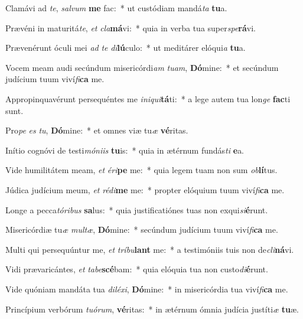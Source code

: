 \item Clamávi ad \textit{te}, \textit{sal}\textit{vum} \textbf{me} fac:~* ut custódiam mandá\textit{ta} \textbf{tu}a.
\item Prævéni in maturitá\textit{te}, \textit{et} \textit{cla}\textbf{má}vi:~* quia in verba tua super\textit{spe}\textbf{rá}vi.
\item Prævenérunt óculi mei \textit{ad} \textit{te} \textit{di}\textbf{lú}culo:~* ut meditárer elóqui\textit{a} \textbf{tu}a.
\item Vocem meam audi secúndum misericórdi\textit{am} \textit{tu}\textit{am}, \textbf{Dó}mine:~* et secúndum judícium tuum viví\textit{fi}\textbf{ca} me.
\item Appropinquavérunt persequéntes me \textit{in}\textit{i}\textit{qui}\textbf{tá}ti:~* a lege autem tua lon\textit{ge} \textbf{fac}ti sunt.
\item Pro\textit{pe} \textit{es} \textit{tu}, \textbf{Dó}mine:~* et omnes viæ tu\textit{æ} \textbf{vé}ritas.
\item Inítio cognóvi de testi\textit{mó}\textit{ni}\textit{is} \textbf{tu}is:~* quia in ætérnum fundás\textit{ti} \textbf{e}a.
\item Vide humilitátem meam, \textit{et} \textit{é}\textit{ri}\textbf{pe} me:~* quia legem tuam non sum \textit{ob}\textbf{lí}tus.
\item Júdica judícium meum, \textit{et} \textit{réd}\textit{i}\textbf{me} me:~* propter elóquium tuum viví\textit{fi}\textbf{ca} me.
\item Longe a pecca\textit{tó}\textit{ri}\textit{bus} \textbf{sa}lus:~* quia justificatiónes tuas non exqui\textit{si}\textbf{é}runt.
\item Misericórdiæ tu\textit{æ} \textit{mul}\textit{tæ}, \textbf{Dó}mine:~* secúndum judícium tuum viví\textit{fi}\textbf{ca} me.
\item Multi qui persequúntur me, \textit{et} \textit{trí}\textit{bu}\textbf{lant} me:~* a testimóniis tuis non de\textit{cli}\textbf{ná}vi.
\item Vidi prævaricántes, \textit{et} \textit{ta}\textit{be}\textbf{scé}bam:~* quia elóquia tua non custo\textit{di}\textbf{é}runt.
\item Vide quóniam mandáta tua \textit{di}\textit{lé}\textit{xi}, \textbf{Dó}mine:~* in misericórdia tua viví\textit{fi}\textbf{ca} me.
\item Princípium verbórum \textit{tu}\textit{ó}\textit{rum}, \textbf{vé}ritas:~* in ætérnum ómnia judícia justíti\textit{æ} \textbf{tu}æ.
